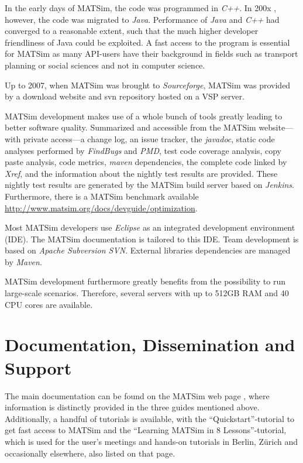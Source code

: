 In the early days of MATSim, the code was programmed in \emph{C++}. In 200x , however, the code was migrated to \emph{Java}. Performance of \emph{Java} and \emph{C++} had converged to a reasonable extent, such that the much higher developer friendliness of Java could be exploited. A fast access to the program is essential for MATSim as many API-users have their background in fields such as transport planning or social sciences and not in computer science. 

Up to 2007, when MATSim was brought to \emph{Sourceforge}, MATSim was provided by a download website and svn repository hosted on a VSP server.

MATSim development makes use of a whole bunch of tools greatly leading to better software quality. Summarized and accessible from the MATSim website---with private access---a change log, an issue tracker, the \emph{javadoc}, static code analyses performed by \emph{FindBugs} and \emph{PMD}, test code coverage analysis, copy paste analysis, code metrics, \emph{maven} dependencies, the complete code linked by \emph{Xref}, and the information about the nightly test results are provided. These nightly test results are generated by the MATSim build server based on \emph{Jenkins}. Furthermore, there is a MATSim benchmark available \url{http://www.matsim.org/docs/devguide/optimization}.

Most MATSim developers use \emph{Eclipse} as an integrated development environment (IDE). The MATSim documentation is tailored to this IDE. Team development is based on \emph{Apache Subversion SVN}. External libraries dependencies are managed by \emph{Maven}. 

MATSim development furthermore greatly benefits from the possibility to run large-scale scenarios. Therefore, several servers with up to 512GB RAM and 40 CPU cores are available.  


\section{Documentation, Dissemination and Support}
The main documentation can be found on the MATSim web page \citep[][]{MATSIM-T-Docu_Webpage_2014}, where information is distinctly provided in the three guides mentioned above. Additionally, a handful of tutorials is available, with the ``Quickstart''-tutorial to get fast access to MATSim and the ``Learning MATSim in 8 Lessons''-tutorial, which is used for the user's meetings and hands-on tutorials in Berlin, Zürich and occasionally elsewhere, also listed on that page. 

